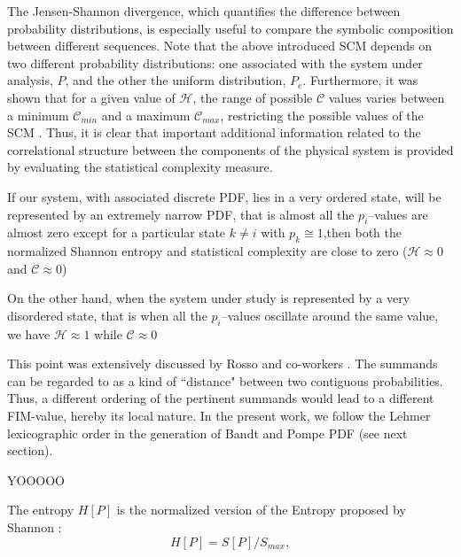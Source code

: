 The Jensen-Shannon divergence, which quantifies the difference between probability distributions, 
is especially useful to compare the symbolic composition between different sequences\cite{JS-Div1991,Grosse2002,JS-Div2014}.
Note that the above introduced SCM depends on two different probability distributions: one associated with the 
system under analysis, $P$, and the other the uniform distribution, $P_e$.
Furthermore, it was shown that for a given value of ${\mathcal H}$, the range of possible ${\mathcal C}$ 
values varies between a minimum ${\mathcal C}_{min}$ and a maximum ${\mathcal C}_{max}$, 
restricting the possible values of the SCM \cite{Martin2006}.
Thus, it is clear that important additional information related to the correlational structure between the 
components of the physical system is provided by evaluating the statistical complexity measure. 

If our system, with associated discrete PDF, lies in a very ordered state, will be represented
by an extremely narrow PDF, that is almost all the 
$p_{i}$--values are almost zero except for a particular state $k \neq i$ with $p_{k} \cong 1$,then both
the normalized Shannon entropy and statistical complexity are close to zero (${\mathcal H} \approx 0$ and 
${\mathcal C} \approx 0$)

On the other hand, when the system under study is represented by  a very disordered state, that is when all the 
$p_{i}$--values oscillate around the same value, we have ${\mathcal H} \approx 1$ while 
${\mathcal C} \approx 0$

This point was extensively discussed by Rosso and co-workers \cite{Olivares2012A,Olivares2012B}.
The summands can be regarded to as a kind of ``distance" between  two contiguous probabilities.
Thus, a different ordering of the pertinent summands would lead to a different FIM-value, hereby its local nature.
In the present work, we follow the Lehmer lexicographic order \cite{Lehmer} in the generation of Bandt and Pompe 
PDF (see next section).

YOOOOO

The entropy $H[P]$ is the normalized version of the Entropy proposed by Shannon \cite{Shannon1948}:%
%
\begin{equation}\label{eq:sha}
H[P] = S[P] /S_{max},
\end{equation}

